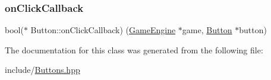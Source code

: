 \subsubsection{\texorpdfstring{onClickCallback}{onClickCallback}}
{\footnotesize\ttfamily bool($\ast$  Button\+::on\+Click\+Callback) (\mbox{\hyperlink{class_game_engine}{Game\+Engine}} $\ast$game, \mbox{\hyperlink{class_button}{Button}} $\ast$button)\hspace{0.3cm}{\ttfamily [protected]}}



The documentation for this class was generated from the following file\+:\begin{DoxyCompactItemize}
\item 
include/\mbox{\hyperlink{_buttons_8hpp}{Buttons.\+hpp}}\end{DoxyCompactItemize}
